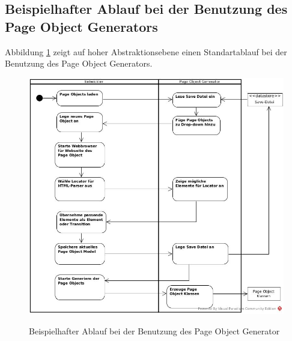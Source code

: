 \subsection{Beispielhafter Ablauf bei der Benutzung des Page Object Generators}
\label{sec:moeglicher_ablauf_eines_standartanwendungsfall}

Abbildung \ref{fig:sequenz} zeigt auf hoher Abstraktionsebene einen Standartablauf bei der Benutzung des Page Object Generators.



\begin{figure}[htb]
  \centering  
  \includegraphics[scale=0.45]{img/Activitydiagram.jpg}\\
  \caption{Beispielhafter Ablauf bei der Benutzung des Page Object Generator}
  \label{fig:sequenz}
\end{figure}

